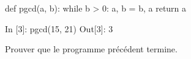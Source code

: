 \documentclass{magnolia}
\begin{document}
\begin{pythoncodeline}
def pgcd(a, b):
    while b > 0:
        a, b = b, a %
    return a
\end{pythoncodeline}

\begin{pythoncode}
In [3]: pgcd(15, 21)
Out[3]: 3
\end{pythoncode}

\begin{exoUnique}
\exo Prouver que le programme précédent termine.
\end{exoUnique}





\end{document}
